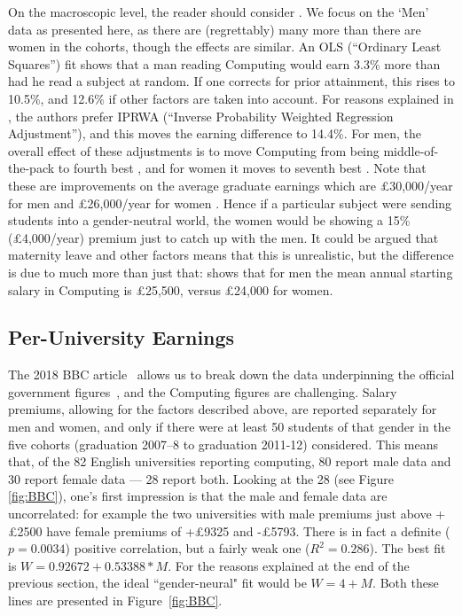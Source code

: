 \documentclass[sigconf,anonymous]{acmart}
\begin{document}
On the macroscopic level, the reader should consider \cite[Table
5]{DfE2018d}. We focus on the `Men' data as presented here, as there
are (regrettably) many more than there are women in the cohorts,
though the effects are similar. An OLS (``Ordinary Least Squares'')
fit shows that a man reading Computing would earn 3.3\% more than had
he read a subject at random. If one corrects for prior attainment,
this rises to 10.5\%, and 12.6\% if other factors are taken into
account. For reasons explained in \cite[\S4.2]{DfE2018d}, the authors
prefer IPRWA (``Inverse Probability Weighted Regression Adjustment''),
and this moves the earning difference to 14.4\%. For men, the overall
effect of these adjustments is to move Computing from being
middle-of-the-pack \cite[Figure 15]{DfE2018d} to fourth best
\cite[Figure 17]{DfE2018d}, and for women it moves to seventh best
\cite[Figure 16]{DfE2018d}. Note that these are improvements on the
average graduate earnings which are \pounds30,000/year for men and
\pounds26,000/year for women \cite[p. 37]{DfE2018d}. Hence if a
particular subject were sending students into a gender-neutral world,
the women would be showing a 15\% (\pounds4,000/year) premium just to
catch up with the men.  It could be argued that maternity leave and
other factors means that this is unrealistic, but the difference is
due to much more than just that: \cite[Figure 14]{HESA2018b} shows
that for men the mean annual starting salary in Computing is \pounds 25,500,
versus \pounds24,000 for women.

\subsection{Per-University Earnings}

The 2018 BBC article~\cite{BBC2018f} allows us to break down the data
underpinning the official government figures~\cite{DfE2018d}, and the
Computing figures are challenging. Salary premiums, allowing for the
factors described above, are reported separately for men and women,
and only if there were at least 50 students of that gender in the five
cohorts (graduation 2007--8 to graduation 2011-12) considered. This
means that, of the 82 English universities reporting computing, 80
report male data and 30 report female data --- 28 report both. Looking
at the 28 (see Figure \ref{fig:BBC}), one's first impression is that
the male and female data are uncorrelated: for example the two
universities with male premiums just above +\pounds2500 have female
premiums of +\pounds9325 and -\pounds5793. There is in fact a definite
($p=0.0034$) positive correlation, but a fairly weak one
($R^2=0.286$). The best fit is $W=0.92672+0.53388*M$. For the reasons
explained at the end of the previous section, the ideal
``gender-neural" fit would be $W=4+M$. Both these lines are presented in
Figure~\ref{fig:BBC}.
\end{document}
